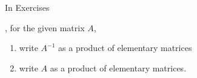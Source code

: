{\noin In Exercises }
{, for the given matrix $A$,
\begin{enumerate}
\item write $A^{-1}$ as a product of elementary matrices
\item write $A$ as a product of elementary matrices.
\end{enumerate}		}
